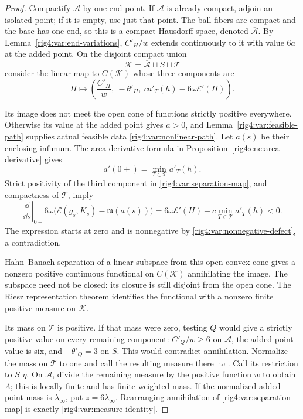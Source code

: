 \begin{proof}
Compactify $\mathcal A$ by one end point. If $\mathcal A$ is already
compact, adjoin an isolated point; if it is empty, use just that point.
The ball fibers are compact and the base has one end, so this is a compact
Hausdorff space, denoted $\overline{\mathcal A}$. By
Lemma~\ref{rig4:var:end-variations}, $C'_H/w$ extends continuously to it with
value $6a$ at the added point. On the disjoint compact union
\[
 \mathcal K=\overline{\mathcal A}\sqcup S\sqcup\mathcal T
\]
consider the linear map to $C(\mathcal K)$ whose three components are
\begin{equation}
 H\longmapsto
 \left(\frac{C'_H}{w},\ -\theta'_H,\
                   c a'_T(h)-6\omega\mathcal E'(H)\right).
\label{rig4:var:separation-map}
\end{equation}

Its image does not meet the open cone of functions strictly positive
everywhere. Otherwise its value at the added point gives $a>0$, and
Lemma~\ref{rig4:var:feasible-path} supplies actual feasible data
\eqref{rig4:var:nonlinear-path}. Let $a(s)$ be their enclosing infimum. The
area derivative formula in Proposition~\ref{rig4:enc:area-derivative} gives
\[
 a'(0+)=\min_{T\in\mathcal T}a'_T(h).
\]
Strict positivity of the third component in \eqref{rig4:var:separation-map},
and compactness of $\mathcal T$, imply
\[
 \left.\frac{\dd}{\dd s}\right|_{0+}
   6\omega\bigl(\mathcal E(g_s,K_s)-\mathfrak m(a(s))\bigr)
   =6\omega\mathcal E'(H)-c\min_{T\in\mathcal T}a'_T(h)<0.
\]
The expression starts at zero and is nonnegative by
\eqref{rig4:var:nonnegative-defect}, a contradiction.

Hahn--Banach separation of a linear subspace from this open convex cone
gives a nonzero positive continuous functional on $C(\mathcal K)$
annihilating the image. The subspace need not be closed: its closure is
still disjoint from the open cone. The Riesz representation theorem
identifies the functional with a nonzero finite positive measure on
$\mathcal K$.

Its mass on $\mathcal T$ is positive. If that mass were zero, testing $Q$
would give a strictly positive value on every remaining component:
$C'_Q/w\ge6$ on $\mathcal A$, the added-point value is six, and
$-\theta'_Q=3$ on $S$. This would contradict annihilation. Normalize the
mass on $\mathcal T$ to one and call the resulting measure there
$\varpi$. Call its restriction to $S$ $\eta$. On $\mathcal A$, divide
the remaining measure by the positive function $w$ to obtain $\Lambda$;
this is locally finite and has finite weighted mass. If the normalized
added-point mass is $\lambda_\infty$, put $z=6\lambda_\infty$.
Rearranging annihilation of \eqref{rig4:var:separation-map} is exactly
\eqref{rig4:var:measure-identity}.
\end{proof}

